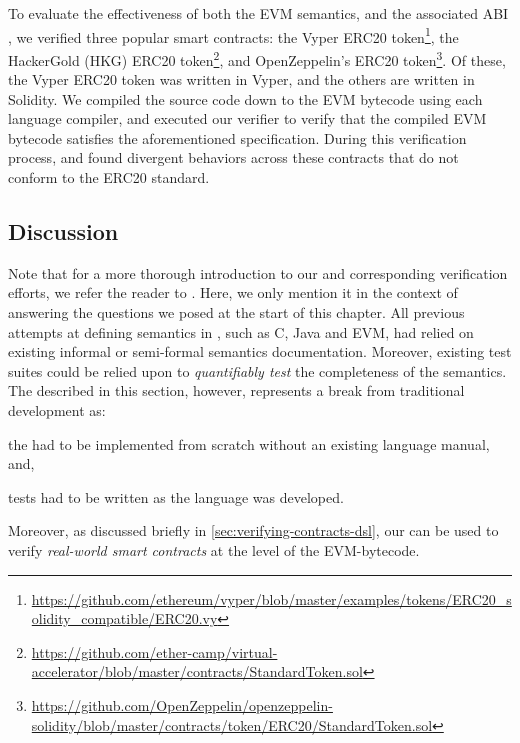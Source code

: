 To evaluate the effectiveness of both the EVM semantics, and the
associated ABI \DSL{}, we verified three popular smart contracts:
the Vyper ERC20 token\footnote{\url{https://github.com/ethereum/vyper/blob/master/examples/tokens/ERC20_solidity_compatible/ERC20.vy}},
the HackerGold (HKG) ERC20 token\footnote{\url{https://github.com/ether-camp/virtual-accelerator/blob/master/contracts/StandardToken.sol}},
and OpenZeppelin's ERC20 token\footnote{\url{https://github.com/OpenZeppelin/openzeppelin-solidity/blob/master/contracts/token/ERC20/StandardToken.sol}}.
Of these, the Vyper ERC20 token was written in Vyper, and the others are written in Solidity.
We compiled the source code down to the EVM bytecode using each language compiler,
and executed our verifier to verify that the compiled EVM bytecode satisfies the aforementioned specification.
During this verification process, and found divergent behaviors across these contracts that do not conform to the ERC20 standard.

\subsection{Discussion}
Note that for a more thorough introduction to our \DSL{} and corresponding
verification efforts, we refer the reader to \cite{HildenbrandtCSF18,ParkFSE18}.
Here, we only mention it in the context of answering
the questions we posed at the start of this chapter. All previous
attempts at defining semantics in \K{}, such as C, Java and EVM,
had relied on existing informal or semi-formal semantics documentation.
Moreover, existing test suites could be relied upon to \emph{quantifiably test}
the completeness of the semantics. The \DSL{} described in this section,
however, represents a break from traditional \K{} development as:
\begin{enumerate*}[label=(\alph*)]
  \item the \DSL{} had to be implemented from scratch without an existing
     language manual, and,
   \item tests had to be written as the language was developed.
\end{enumerate*}
Moreover, as discussed briefly in \ref{sec:verifying-contracts-dsl},
our \DSL{} can be used to verify \emph{real-world smart contracts} at the
level of the EVM-bytecode.

